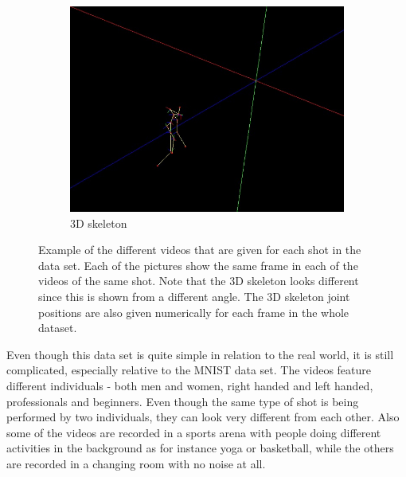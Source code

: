 \begin{figure}
\begin{subfigure}{.32\linewidth}
        \includegraphics[width=\linewidth]{Pics/04_Data/frame53_skelet3D.jpg}
        \caption{3D skeleton}
    \end{subfigure}
    \caption{Example of the different videos that are given for each shot in the data set. Each of the pictures show the same frame in each of the videos of the same shot. Note that the 3D skeleton looks different since this is shown from a different angle. The 3D skeleton joint positions are also given numerically for each frame in the whole dataset.}
    \label{fig:exampleVideosTennis}
\end{figure}

Even though this data set is quite simple in relation to the real world, it is still complicated, especially relative to the MNIST data set. The videos feature different individuals - both men and women, right handed and left handed, professionals and beginners. Even though the same type of shot is being performed by two individuals, they can look very different from each other. Also some of the videos are recorded in a sports arena with people doing different activities in the background as for instance yoga or basketball, while the others are recorded in a changing room with no noise at all.

